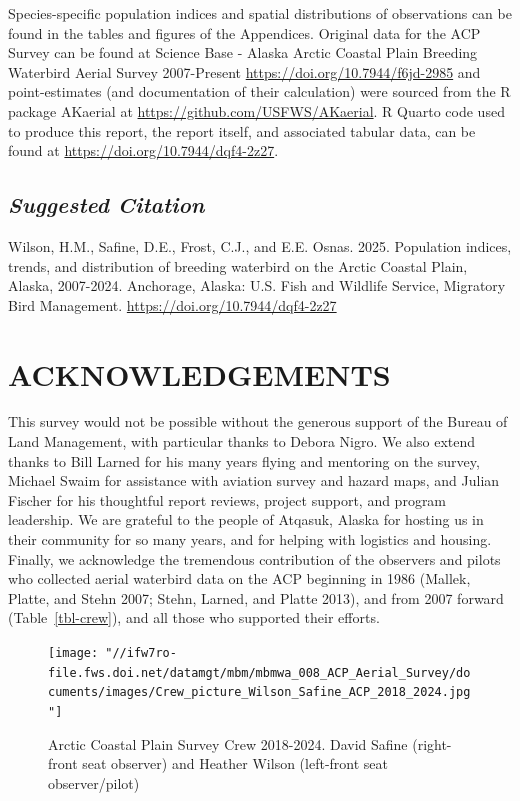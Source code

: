 \documentclass[
]{article}
\begin{document}
Species-specific population indices and spatial distributions of
observations can be found in the tables and figures of the Appendices.
Original data for the ACP Survey can be found at Science Base - Alaska
Arctic Coastal Plain Breeding Waterbird Aerial Survey 2007-Present
\url{https://doi.org/10.7944/f6jd-2985} and point-estimates (and
documentation of their calculation) were sourced from the R package
AKaerial at \url{https://github.com/USFWS/AKaerial}. R Quarto code used
to produce this report, the report itself, and associated tabular data,
can be found at \url{https://doi.org/10.7944/dqf4-2z27}.

\subsection*{\texorpdfstring{\emph{Suggested
Citation}}{Suggested Citation}}\label{suggested-citation}

Wilson, H.M., Safine, D.E., Frost, C.J., and E.E. Osnas. 2025.
Population indices, trends, and distribution of breeding waterbird on
the Arctic Coastal Plain, Alaska, 2007-2024. Anchorage, Alaska: U.S.
Fish and Wildlife Service, Migratory Bird Management.
\url{https://doi.org/10.7944/dqf4-2z27}

\section*{ACKNOWLEDGEMENTS}\label{acknowledgements}

This survey would not be possible without the generous support of the
Bureau of Land Management, with particular thanks to Debora Nigro. We
also extend thanks to Bill Larned for his many years flying and
mentoring on the survey, Michael Swaim for assistance with aviation
survey and hazard maps, and Julian Fischer for his thoughtful report
reviews, project support, and program leadership. We are grateful to the
people of Atqasuk, Alaska for hosting us in their community for so many
years, and for helping with logistics and housing. Finally, we
acknowledge the tremendous contribution of the observers and pilots who
collected aerial waterbird data on the ACP beginning in 1986 (Mallek,
Platte, and Stehn 2007; Stehn, Larned, and Platte 2013), and from 2007
forward (Table~\ref{tbl-crew}), and all those who supported their
efforts.

\begin{figure}[H]

{\centering \texttt{[image: "//ifw7ro-file.fws.doi.net/datamgt/mbm/mbmwa\_008\_ACP\_Aerial\_Survey/documents/images/Crew\_picture\_Wilson\_Safine\_ACP\_2018\_2024.jpg"]}

}

\caption{Arctic Coastal Plain Survey Crew 2018-2024. David Safine
(right-front seat observer) and Heather Wilson (left-front seat
observer/pilot)}

\end{figure}%
\end{document}
